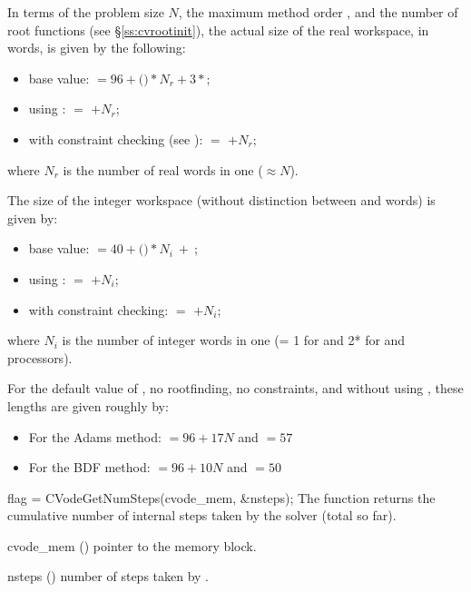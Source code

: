{
  In terms of the problem size $N$, the maximum method order , and
  the number  of root functions (see \S\ref{ss:cvrootinit}),
  the actual size of the real workspace, in  words, is
  given by the following:
  \begin{itemize}
  \item base value:  $= 96 + ($$)*N_r + 3*$;
  \item using :  $=$  $+ N_r$;
  \item with constraint checking (see ):
     $=$  $+ N_r$;
  \end{itemize}
  where $N_r$ is the number of real words in one  ($\approx N$).

  The size of the integer workspace (without distinction between 
  and  words) is given by:
  \begin{itemize}
  \item base value:  $= 40 + ($$)*N_i ~ + ~ $;
  \item using :  $=$  $+ N_i$;
  \item with constraint checking:  $=$  $+ N_i$;
  \end{itemize}
  where $N_i$ is the number of integer words in one 
  (= 1 for {\nvecs} and 2* for {\nvecp} and  processors).

  For the default value of , no rootfinding, no constraints, and 
  without using , these lengths are given roughly by:
  \begin{itemize}
  \item For the Adams method:  $= 96 + 17N$ and  $= 57$
  \item For the BDF method:  $= 96 + 10N$ and  $= 50$
  \end{itemize}
}
{
  flag = CVodeGetNumSteps(cvode\_mem, \&nsteps);
}
{
  The function  returns the cumulative number of internal
  steps taken by the solver (total so far).
}
{
  \begin{args}
  \item[cvode\_mem] ()
    pointer to the {\cvode} memory block.
  \item[nsteps] ()
    number of steps taken by {\cvode}.
  \end{args}
}
